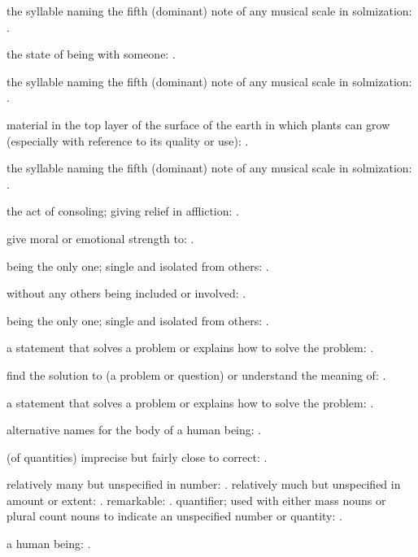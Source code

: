   the syllable naming the fifth (dominant) note of any musical scale in solmization: .

  the state of being with someone: .

  the syllable naming the fifth (dominant) note of any musical scale in solmization: .

  material in the top layer of the surface of the earth in which plants can grow (especially with reference to its quality or use): .

  the syllable naming the fifth (dominant) note of any musical scale in solmization: .

  the act of consoling; giving relief in affliction: .

  give moral or emotional strength to: .

  being the only one; single and isolated from others: .

  without any others being included or involved: .

  being the only one; single and isolated from others: .

  a statement that solves a problem or explains how to solve the problem: .

  find the solution to (a problem or question) or understand the meaning of: .

  a statement that solves a problem or explains how to solve the problem: .

  alternative names for the body of a human being: .

  (of quantities) imprecise but fairly close to correct: .

  relatively many but unspecified in number: . relatively much but unspecified in amount or extent: . remarkable: . quantifier; used with either mass nouns or plural count nouns to indicate an unspecified number or quantity: .

  a human being: .

